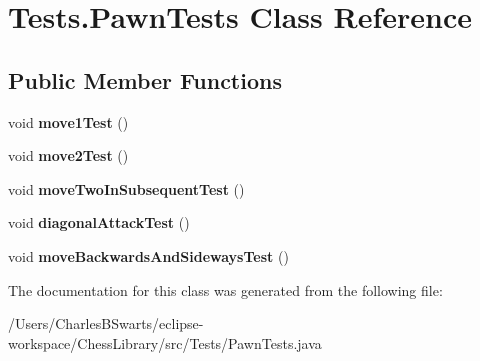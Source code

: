\hypertarget{class_tests_1_1_pawn_tests}{}\section{Tests.\+Pawn\+Tests Class Reference}
\label{class_tests_1_1_pawn_tests}
\subsection*{Public Member Functions}
\begin{DoxyCompactItemize}
\item 
\mbox{\label{class_tests_1_1_pawn_tests_a38e429241dcc2ad5ccfdee2b4d1b86e8}} 
void {\bfseries move1\+Test} ()
\item 
\mbox{\label{class_tests_1_1_pawn_tests_a471cf3effb997ffac9c70d24780bc94b}} 
void {\bfseries move2\+Test} ()
\item 
\mbox{\label{class_tests_1_1_pawn_tests_a178ebd0459ba6a58c2a6dd8c34394d66}} 
void {\bfseries move\+Two\+In\+Subsequent\+Test} ()
\item 
\mbox{\label{class_tests_1_1_pawn_tests_aa57ba1a300c2ae88e8abf71e24d89eae}} 
void {\bfseries diagonal\+Attack\+Test} ()
\item 
\mbox{\label{class_tests_1_1_pawn_tests_aad3574dfffe7eb3771f68404801045ee}} 
void {\bfseries move\+Backwards\+And\+Sideways\+Test} ()
\end{DoxyCompactItemize}


The documentation for this class was generated from the following file\+:\begin{DoxyCompactItemize}
\item 
/\+Users/\+Charles\+B\+Swarts/eclipse-\/workspace/\+Chess\+Library/src/\+Tests/Pawn\+Tests.\+java\end{DoxyCompactItemize}

